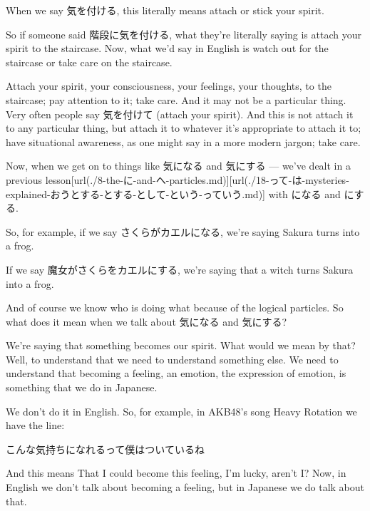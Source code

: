 When we say 気を付ける, this literally means attach or stick your spirit.

{}

So if someone said 階段に気を付ける, what they're literally saying is attach your spirit to the staircase. Now, what we'd say in English is watch out for the staircase or take care on the staircase.

Attach your spirit, your consciousness, your feelings, your thoughts, to the staircase; pay attention to it; take care. And it may not be a particular thing. Very often people say 気を付けて (attach your spirit). And this is not attach it to any particular thing, but attach it to whatever it's appropriate to attach it to; have situational awareness, as one might say in a more modern jargon; take care.

\startsectionlevel[title={気になる & 気にする},reference={気になる-気にする}]

Now, when we get on to things like 気になる and 気にする --- we've dealt in a previous lesson\goto{{[}8{]}}[url(./8-the-に-and-へ-particles.md)]\goto{{[}18{]}}[url(./18-って-は-mysteries-explained-おうとする-とする-として-という-っていう.md)] with になる and にする.　

{}

So, for example, if we say さくらがカエルになる, we're saying Sakura turns into a frog.

{}

If we say 魔女がさくらをカエルにする, we're saying that a witch turns Sakura into a frog.

{}

And of course we know who is doing what because of the logical particles. So what does it mean when we talk about 気になる and 気にする?

{}

We're saying that something becomes our spirit. What would we mean by that? Well, to understand that we need to understand something else. We need to understand that becoming a feeling, an emotion, the expression of emotion, is something that we do in Japanese.

We don't do it in English. So, for example, in AKB48's song Heavy Rotation we have the line:

こんな気持ちになれるって僕はついているね

And this means That I could become this feeling, I'm lucky, aren't I? Now, in English we don't talk about becoming a feeling, but in Japanese we do talk about that.

